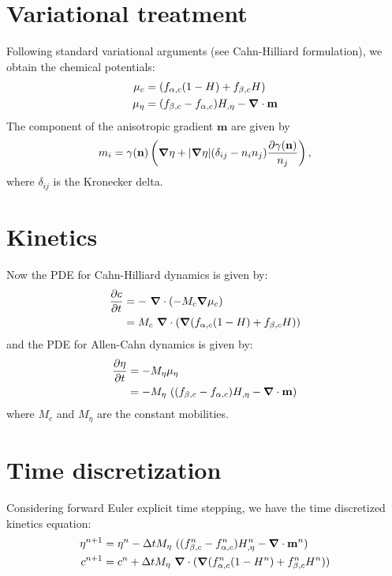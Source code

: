 \documentclass[10pt]{article}
\newcommand{\gv}[1]{\ensuremath{\mbox{\boldmath$ #1 $}}}
\newcommand{\grad}[1]{\gv{\nabla} #1}
\begin{document}
\section{Variational treatment}
Following standard variational arguments (see Cahn-Hilliard formulation), we obtain the chemical potentials:
\begin{align}
  \mu_{c}  &= (f_{\alpha,c}(1-H)+f_{\beta,c}H)  \\
  \mu_{\eta}  &= (f_{\beta,c}-f_{\alpha,c})H_{,\eta} - \grad \cdot \mathbf{m}
\end{align}
The component of the anisotropic gradient $\mathbf{m}$ are given by
\begin{equation}
m_i = \gamma(\mathbf{n}) \left( \grad \eta + |\grad \eta| (\delta_{ij}-n_i n_j) \frac{\partial \gamma (\mathbf{n})}{n_j} \right),
\end{equation}
where $\delta_{ij}$ is the Kronecker delta.

\section{Kinetics}
Now the PDE for Cahn-Hilliard dynamics is given by:
\begin{align}
  \frac{\partial c}{\partial t} &= -~\grad \cdot (-M_c\grad \mu_c)\\
  &=M_c~\grad \cdot (\grad (f_{\alpha,c}(1-H)+f_{\beta,c}H)) 
  \end{align}
  and the PDE for Allen-Cahn dynamics is given by:
  \begin{align}
    \frac{\partial \eta}{\partial t} &= -M_\eta \mu_\eta \\
  &=-M_\eta ~ ((f_{\beta,c}-f_{\alpha,c})H_{,\eta} - \grad \cdot \mathbf{m}) 
\end{align}
where $M_c$ and $M_\eta$ are the constant mobilities. 

\section{Time discretization}
Considering forward Euler explicit time stepping, we have the time discretized kinetics equation:
\begin{align}
 \eta^{n+1} &= \eta^{n}  - \Delta t M_{\eta}~ ((f_{\beta,c}^n-f_{\alpha,c}^n)H_{,\eta}^n -  \grad \cdot \mathbf{m}^n) \\
c^{n+1} &= c^{n}  + \Delta t M_{\eta}~\grad \cdot (\grad (f_{\alpha,c}^n(1-H^{n})+f_{\beta,c}^n H^{n}))
\end{align}
\end{document}
